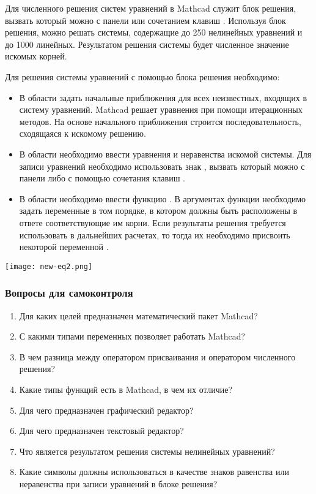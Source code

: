 Для численного решения систем уравнений в Mathcad служит блок решения, вызвать который можно с панели  или сочетанием клавиш . Используя блок решения, можно решать системы, содержащие до 250 нелинейных уравнений и до 1000 линейных. Результатом решения системы будет численное значение искомых корней.

Для решения системы уравнений с помощью блока решения необходимо:
\begin{itemize}
	\item В области  задать начальные приближения для всех неизвестных, входящих в систему уравнений. Mathcad решает уравнения при помощи итерационных методов. На основе начального приближения строится последовательность, сходящаяся к искомому решению.
	\item В области  необходимо ввести уравнения и неравенства искомой системы. Для записи уравнений необходимо использовать знак , вызвать который можно с панели  либо с помощью сочетания клавиш \keys{\ctrl+=}.
	\item В области  необходимо ввести функцию . В аргументах функции необходимо задать переменные в том порядке, в котором должны быть расположены в ответе соответствующие им корни. Если результаты решения требуется использовать в дальнейших расчетах, то тогда их необходимо присвоить некоторой переменной .
\end{itemize}

\begin{center}
	\texttt{[image: new-eq2.png]}
\end{center}


\subsubsection*{Вопросы для самоконтроля}
\begin{enumerate}
	\item Для каких целей предназначен математический пакет Mathcad?
	\item С какими типами переменных позволяет работать Mathcad?
	\item В чем разница между оператором присваивания и оператором численного решения?
	\item Какие типы функций есть в Mathcad, в чем их отличие?
	\item Для чего предназначен графический редактор?
	\item Для чего предназначен текстовый редактор?
	\item Что является результатом решения системы нелинейных уравнений?
	\item Какие символы должны использоваться в качестве знаков равенства или неравенства при записи уравнений в блоке решения?
\end{enumerate}

